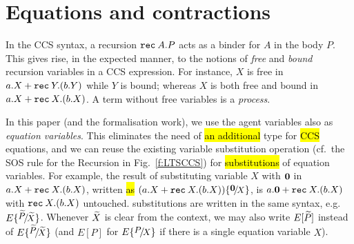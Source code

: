 \section{Equations and contractions}
\label{s:eq}

In the CCS syntax, 
a recursion ${\tt rec}\: A . P$ acts as a binder for $A$ in the body $P$. 
This gives rise, in the expected manner, to the notions of 
\emph{free} and \emph{bound} recursion variables in a CCS expression. 
For instance,  $X$ is free in $a.X + {\tt rec}\: Y . (b.Y)$ while $Y$
is bound; whereas 
$X$ is both free and bound 
 in $a.X + {\tt rec}\: X . (b.X)$.
A term without free variables is  a \emph{process}.

In this paper (and the formalisation work), we use the agent
variables also as \emph{equation variables}. This eliminates the need of
\hl{an additional} type for \hl{CCS} equations, and we can reuse the existing
variable substitution operation (cf.~the SOS rule for the Recursion in
Fig.~\ref{f:LTSCCS}) for \hl{substitutions} of equation variables.
For example, the result of substituting  variable $X$ with ${\boldsymbol 0}$ in $a.X +
{\tt rec}\: X . (b.X)$,  written \hl{as} $(a.X + \recu X (b.X)) \sub {\nil} X$, is
$a.{\boldsymbol 0} + {\tt rec}\: X . (b.X)$ with ${\tt rec}\: X . (b.X)$
untouched. \Multivariate substitutions are written in the same syntax,
e.g. $E \sub {\til P} {\til X}$. Whenever $\widetilde X$ is clear from the
context, we may also write $E[\widetilde P]$ instead of $E \sub {\til P} {\til
  X}$ (and $E[P]$ for $E \sub P X$ if there is a single equation
variable $X$). 

 
